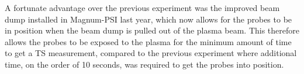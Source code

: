 \documentclass[a4paper, 12pt]{article} %
\begin{document}
	A fortunate advantage over the previous experiment was the improved beam dump installed in Magnum-PSI last year, which now allows for the probes to be in position when the beam dump is pulled out of the plasma beam. 
	This therefore allows the probes to be exposed to the plasma for the minimum amount of time to get a TS measurement, compared to the previous experiment where additional time, on the order of 10 seconds, was required to get the probes into position.
	
\end{document}
